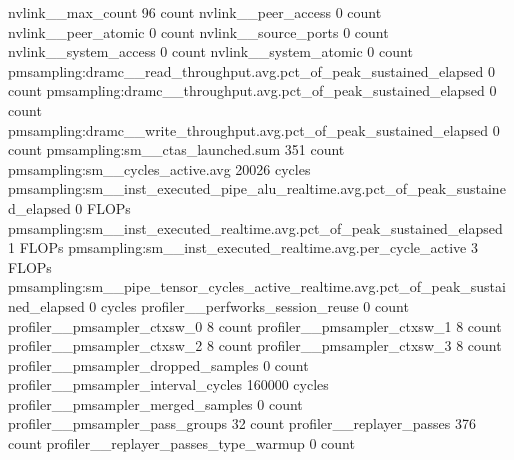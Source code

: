 nvlink__max_count                                                                             96 count
nvlink__peer_access                                                                            0 count
nvlink__peer_atomic                                                                            0 count
nvlink__source_ports                                                                           0 count
nvlink__system_access                                                                          0 count
nvlink__system_atomic                                                                          0 count
pmsampling:dramc__read_throughput.avg.pct_of_peak_sustained_elapsed                            0 count
pmsampling:dramc__throughput.avg.pct_of_peak_sustained_elapsed                                 0 count
pmsampling:dramc__write_throughput.avg.pct_of_peak_sustained_elapsed                           0 count
pmsampling:sm__ctas_launched.sum                                                             351 count
pmsampling:sm__cycles_active.avg                                                           20026 cycles
pmsampling:sm__inst_executed_pipe_alu_realtime.avg.pct_of_peak_sustained_elapsed               0 FLOPs
pmsampling:sm__inst_executed_realtime.avg.pct_of_peak_sustained_elapsed                        1 FLOPs
pmsampling:sm__inst_executed_realtime.avg.per_cycle_active                                     3 FLOPs
pmsampling:sm__pipe_tensor_cycles_active_realtime.avg.pct_of_peak_sustained_elapsed               0 cycles
profiler__perfworks_session_reuse                                                              0 count
profiler__pmsampler_ctxsw_0                                                                    8 count
profiler__pmsampler_ctxsw_1                                                                    8 count
profiler__pmsampler_ctxsw_2                                                                    8 count
profiler__pmsampler_ctxsw_3                                                                    8 count
profiler__pmsampler_dropped_samples                                                            0 count
profiler__pmsampler_interval_cycles                                                       160000 cycles
profiler__pmsampler_merged_samples                                                             0 count
profiler__pmsampler_pass_groups                                                               32 count
profiler__replayer_passes                                                                    376 count
profiler__replayer_passes_type_warmup                                                          0 count
